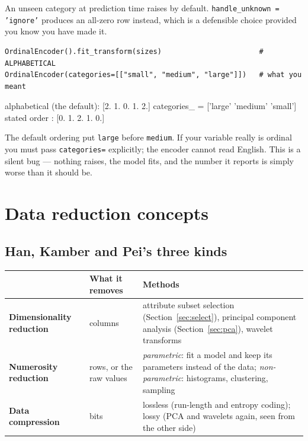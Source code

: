 \documentclass[11pt]{article}
\begin{document}
An unseen category at prediction time raises by default. \texttt{handle\_unknown
= 'ignore'} produces an all-zero row instead, which is a defensible choice
provided you know you have made it.

\begin{lstlisting}
OrdinalEncoder().fit_transform(sizes)                       # ALPHABETICAL
OrdinalEncoder(categories=[["small", "medium", "large"]])   # what you meant
\end{lstlisting}
\begin{codeout}
alphabetical (the default): [2. 1. 0. 1. 2.]
   categories_ = ['large' 'medium' 'small']
stated order              : [0. 1. 2. 1. 0.]
\end{codeout}

\begin{caution}
The default ordering put \texttt{large} before \texttt{medium}. If your
variable really is ordinal you must pass \texttt{categories=} explicitly; the
encoder cannot read English. This is a silent bug --- nothing raises, the model
fits, and the number it reports is simply worse than it should be.
\end{caution}

\notesources{\AMLUnitIVSources}

\section{Data reduction concepts}
\label{sec:reduce}

\subsection{Han, Kamber and Pei's three kinds}

\begin{center}
\begin{tabular}{@{}lp{4.4cm}p{5.2cm}@{}}
\toprule
& \textbf{What it removes} & \textbf{Methods}\\
\midrule
\textbf{Dimensionality reduction} & columns &
  attribute subset selection (Section~\ref{sec:select}), principal component
  analysis (Section~\ref{sec:pca}), wavelet transforms\\[4pt]
\textbf{Numerosity reduction} & rows, or the raw values &
  \emph{parametric}: fit a model and keep its parameters instead of the data;
  \emph{non-parametric}: histograms, clustering, sampling\\[4pt]
\textbf{Data compression} & bits &
  lossless (run-length and entropy coding); lossy (PCA and wavelets again,
  seen from the other side)\\
\bottomrule
\end{tabular}
\end{center}
\end{document}
